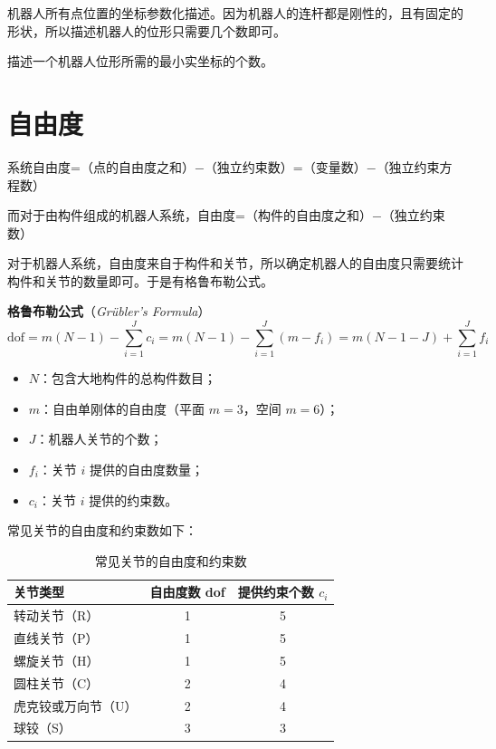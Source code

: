 
\begin{definition}
	机器人所有点位置的坐标参数化描述。因为机器人的连杆都是刚性的，且有固定的形状，所以描述机器人的位形只需要几个数即可。
\end{definition}

\begin{definition}
	描述一个机器人位形所需的最小实坐标的个数。
\end{definition}

\section{自由度}

系统自由度=（点的自由度之和）$-$（独立约束数）=（变量数）$-$（独立约束方程数）

而对于由构件组成的机器人系统，自由度=（构件的自由度之和）$-$（独立约束数）

对于机器人系统，自由度来自于构件和关节，所以确定机器人的自由度只需要统计构件和关节的数量即可。于是有格鲁布勒公式。

\textbf{格鲁布勒公式}（\textit{Grübler's Formula}）
\begin{equation}
	\label{eq:自由度:格鲁布勒公式}
	\mathrm{dof}=m(N-1)-\sum_{i=1}^{J}c_{i}=m(N-1)-\sum_{i=1}^{J}(m-f_{i})=m(N-1-J)+\sum_{i=1}^{J}f_{i}
\end{equation}
\begin{itemize}
	\item $N$：包含大地构件的总构件数目；
	\item $m$：自由单刚体的自由度（平面 $m=3$，空间 $m=6$）；
	\item $J$：机器人关节的个数；
	\item $f_{i}$：关节 $i$ 提供的自由度数量；
	\item $c_{i}$：关节 $i$ 提供的约束数。
\end{itemize}

常见关节的自由度和约束数如下：
\begin{table}[H]
	\centering
	\caption{常见关节的自由度和约束数}
	\label{tab:自由度:常见关节}
	\begin{tabular}{lcc}
		\hline
		关节类型 & 自由度数 dof & 提供约束个数 $c_{i}$ \\
		\hline
		转动关节（R） & 1 & 5 \\
		直线关节（P） & 1 & 5 \\
		螺旋关节（H） & 1 & 5 \\
		圆柱关节（C） & 2 & 4 \\
		虎克铰或万向节（U） & 2 & 4 \\
		球铰（S） & 3 & 3 \\
		\hline
	\end{tabular}
\end{table}

